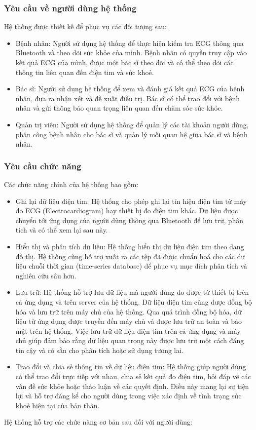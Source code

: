 \documentclass{article}%
\begin{document}
\subsubsection{Yêu cầu về người dùng hệ thống}
Hệ thống được thiết kế để phục vụ các đối tượng sau:
\begin{itemize}
    \item Bệnh nhân: Người sử dụng hệ thống để thực hiện kiểm tra ECG thông qua Bluetooth và theo dõi sức khỏe của mình. Bệnh nhân có quyền truy cập vào kết quả ECG của mình, được một bác sĩ theo dõi và có thể theo dõi các thông tin liên quan đến điện tim và sức khoẻ.
    \item Bác sĩ: Người sử dụng hệ thống để xem và đánh giá kết quả ECG của bệnh nhân, đưa ra nhận xét và đề xuất điều trị. Bác sĩ có thể trao đổi với bệnh nhân và gửi thông báo quan trọng liên quan đến chăm sóc sức khỏe.
    \item Quản trị viên: Người sử dụng hệ thống để quản lý các tài khoản người dùng, phân công bệnh nhân cho bác sĩ và quản lý mối quan hệ giữa bác sĩ và bệnh nhân.
\end{itemize}

\subsubsection{Yêu cầu chức năng}
Các chức năng chính của hệ thống bao gồm: 
\begin{itemize}
    \item Ghi lại dữ liệu điện tim: Hệ thống cho phép ghi lại tín hiệu điện tim từ máy đo ECG (Electrocardiogram) hay thiết bị đo điện tim khác. Dữ liệu được chuyển tới ứng dụng của người dùng thông qua Bluetooth để lưu trữ, phân tích và có thể xem lại sau này.

    \item Hiển thị và phân tích dữ liệu: Hệ thống hiển thị dữ liệu điện tim theo dạng đồ thị. Hệ thống cũng hỗ trợ xuất ra các tệp đã được chuẩn hoá cho các dữ liệu chuỗi thời gian (time-series database) để phục vụ mục đích phân tích và nghiên cứu sâu hơn.

    \item Lưu trữ: Hệ thống hỗ trợ lưu dữ liệu mà người dùng đo được từ thiết bị trên cả ứng dụng và trên server của hệ thống. Dữ liệu điện tim cũng được đồng bộ hóa và lưu trữ trên máy chủ của hệ thống. Qua quá trình đồng bộ hóa, dữ liệu từ ứng dụng được truyền đến máy chủ và được lưu trữ an toàn và bảo mật trên hệ thống. Việc lưu trữ dữ liệu điện tim trên cả ứng dụng và máy chủ giúp đảm bảo rằng dữ liệu quan trọng này được lưu trữ một cách đáng tin cậy và có sẵn cho phân tích hoặc sử dụng tương lai.

    \item Trao đổi và chia sẻ thông tin về dữ liệu điện tim: Hệ thống giúp người dùng có thể trao đổi trực tiếp với nhau, chia sẻ kết quả đo điện tim, hỏi đáp về các vấn đề sức khỏe hoặc thảo luận về các quyết định. Điều này mang lại sự tiện lợi và hỗ trợ đáng kể cho người dùng trong việc xác định về tình trạng sức khoẻ hiện tại của bản thân.
\end{itemize}
Hệ thống hỗ trợ các chức năng cơ bản sau đối với người dùng:
\end{document}
